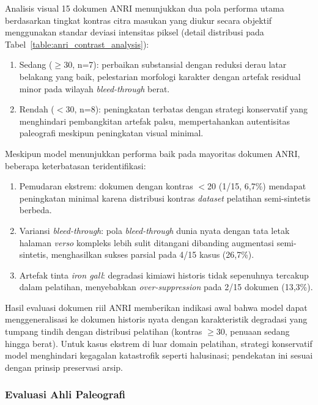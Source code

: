 Analisis visual 15 dokumen ANRI menunjukkan dua pola performa utama berdasarkan tingkat kontras citra masukan yang diukur secara objektif menggunakan standar deviasi intensitas piksel (detail distribusi pada Tabel~\ref{table:anri_contrast_analysis}):
\begin{enumerate}[leftmargin=1.5em, labelsep=0.5em, itemindent=0pt, noitemsep, topsep=0pt]
  \item Sedang ($\geq$30, n=7): perbaikan substansial dengan reduksi derau latar belakang yang baik, pelestarian morfologi karakter dengan artefak residual minor pada wilayah \textit{bleed-through} berat.
  \item Rendah ($<$30, n=8): peningkatan terbatas dengan strategi konservatif yang menghindari pembangkitan artefak palsu, mempertahankan autentisitas paleografi meskipun peningkatan visual minimal.
\end{enumerate}


Meskipun model menunjukkan performa baik pada mayoritas dokumen ANRI, beberapa keterbatasan teridentifikasi:
\begin{enumerate}[leftmargin=1.5em, labelsep=0.5em, itemindent=0pt, noitemsep, topsep=0pt]
  \item Pemudaran ekstrem: dokumen dengan kontras $<$20 (1/15, 6,7\%) mendapat peningkatan minimal karena distribusi kontras \textit{dataset} pelatihan semi-sintetis berbeda.
  \item Variansi \textit{bleed-through}: pola \textit{bleed-through} dunia nyata dengan tata letak halaman \textit{verso} kompleks lebih sulit ditangani dibanding augmentasi semi-sintetis, menghasilkan sukses parsial pada 4/15 kasus (26,7\%).
  \item Artefak tinta \textit{iron gall}: degradasi kimiawi historis tidak sepenuhnya tercakup dalam pelatihan, menyebabkan \textit{over-suppression} pada 2/15 dokumen (13,3\%).
\end{enumerate}

Hasil evaluasi dokumen riil ANRI memberikan indikasi awal bahwa model dapat menggeneralisasi ke dokumen historis nyata dengan karakteristik degradasi yang tumpang tindih dengan distribusi pelatihan (kontras $\geq$30, penuaan sedang hingga berat). Untuk kasus ekstrem di luar domain pelatihan, strategi konservatif model menghindari kegagalan katastrofik seperti halusinasi; pendekatan ini sesuai dengan prinsip preservasi arsip.



\subsubsection{Evaluasi Ahli Paleografi}
\label{subsubsec:anri-validasi-ahli}

